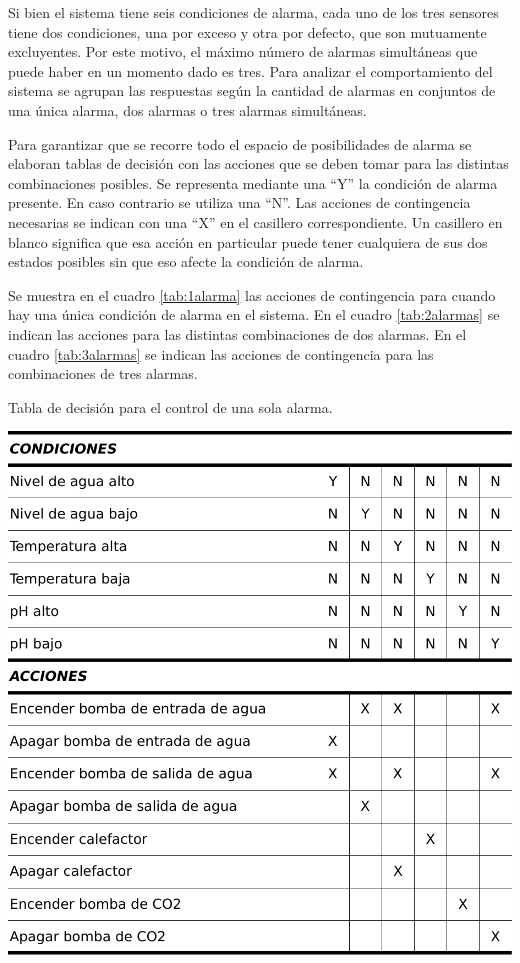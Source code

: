 Si bien el sistema tiene seis condiciones de alarma, cada uno de los tres sensores tiene dos condiciones, una por exceso y otra por defecto, que son mutuamente excluyentes.  Por este motivo, el máximo número de alarmas simultáneas que puede haber en un momento dado es tres. Para analizar el comportamiento del sistema se agrupan las respuestas según la cantidad de alarmas en conjuntos de una única alarma, dos alarmas o tres alarmas simultáneas.

Para garantizar que se recorre todo el espacio de posibilidades de alarma se elaboran tablas de decisión con las acciones que se deben tomar para las distintas combinaciones posibles.  Se representa mediante una ``Y'' la condición de alarma presente.  En caso contrario se utiliza una ``N''. Las acciones de contingencia necesarias se indican con una ``X'' en el casillero correspondiente. Un casillero en blanco significa que esa acción en particular puede tener cualquiera de sus dos estados posibles sin que eso afecte la condición de alarma. 

Se muestra en el cuadro \ref{tab:1alarma} las acciones de contingencia para cuando hay una única condición de alarma en el sistema.  En el cuadro \ref{tab:2alarmas} se indican las acciones para las distintas combinaciones de dos alarmas. En el cuadro \ref{tab:3alarmas} se indican las acciones de contingencia para las combinaciones de tres alarmas.


\begin{table}[ht]
	\centering
	\caption{Tabla de decisión para el control de una sola alarma.}
    \includegraphics[height=.4\textheight]{./Figures/tabla1alarma.pdf}
	\label{tab:1alarma}
\end{table}

